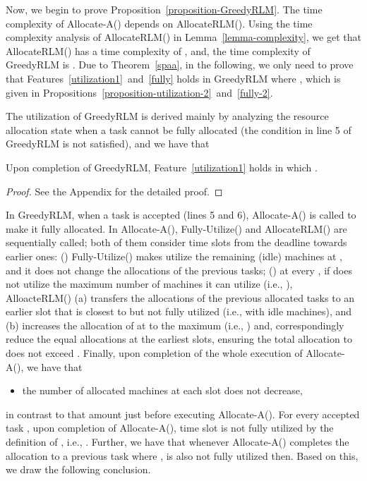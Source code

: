 \documentclass[10pt,journal,compsoc]{IEEEtran}
\newcommand{\rmnum}[1]{\romannumeral #1}
\begin{document}
Now, we begin to prove Proposition~\ref{proposition-GreedyRLM}. The time complexity of Allocate-A() depends on AllocateRLM(). Using the time complexity analysis of AllocateRLM() in Lemma~\ref{lemma-complexity}, we get that AllocateRLM() has a time complexity of , and, the time complexity of GreedyRLM is . Due to Theorem~\ref{spaa}, in the following, we only need to prove that Features~\ref{utilization1}~and~\ref{fully} holds in GreedyRLM where , which is given in Propositions~\ref{proposition-utilization-2}~and~\ref{fully-2}.


The utilization of GreedyRLM is derived mainly by analyzing the resource allocation state when a task  cannot be fully allocated (the condition in line 5 of GreedyRLM is not satisfied), and we have that
\begin{proposition}\label{proposition-utilization-2}
Upon completion of GreedyRLM, Feature~\ref{utilization1} holds in which .
\end{proposition}\begin{proof}
See the Appendix for the detailed proof.
\end{proof}





In GreedyRLM, when a task  is accepted (lines 5 and 6), Allocate-A() is called to make it fully allocated. In Allocate-A(), Fully-Utilize() and AllocateRLM() are sequentially called; both of them consider time slots  from the deadline towards earlier ones: (\rmnum{1}) Fully-Utilize() makes  utilize the remaining (idle) machines at , and it does not change the allocations of the previous tasks; (\rmnum{2}) at every , if  does not utilize the maximum number of machines it can utilize (i.e., ), AlloacteRLM() (a) transfers the allocations of the previous allocated tasks to an earlier slot that is closest to  but not fully utilized (i.e., with idle machines), and (b) increases the allocation of  at  to the maximum (i.e., ) and, correspondingly reduce the equal allocations at the earliest slots, ensuring the total allocation to  does not exceed . Finally, upon completion of the whole execution of Allocate-A(), we have that
\begin{itemize}
\item the number of allocated machines at each slot does not decrease,
\end{itemize}
in contrast to that amount just before executing Allocate-A(). For every accepted task , upon completion of Allocate-A(), time slot  is not fully utilized by the definition of , i.e., . Further, we have that whenever Allocate-A() completes the allocation to a previous task  where ,  is also not fully utilized then. Based on this, we draw the following conclusion.
\end{document}
